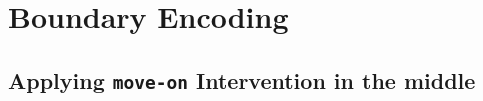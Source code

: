 \section{Boundary Encoding}
\label{app:boundary}

\subsection{Applying \texttt{move-on} Intervention in the middle}